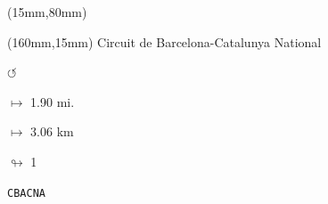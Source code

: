 \begin{textblock*}{185mm}(15mm,80mm)%
\end{textblock*}
\begin{textblock*}{40mm}(160mm,15mm)%
Circuit de Barcelona-Catalunya National
\par \Huge$\circlearrowleft$
\Large
\par$\mapsto$ 1.90 mi.
\par$\mapsto$ 3.06 km
\par$\looparrowright$ 1
\par\hfill\tiny\tt CBACNA\\
\end{textblock*}
\null\newpage

